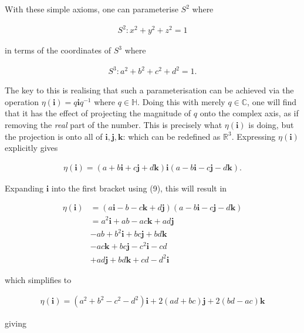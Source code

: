 \documentclass[fleqn, twocolumn, 10pt]{article}
\begin{document}
With these simple axioms, one can parameterise $S^2$ where

\begin{ceqn}
\begin{align*}
S^2 : x^2 + y^2 + z^2 = 1
\end{align*}
\end{ceqn}
in terms of the coordinates of $S^3$ where


\begin{ceqn}
\begin{align}\tag{10}
S^3 : a^2 + b^2 + c^2 + d^2 = 1.
\end{align}
\end{ceqn}
The key to this is realising that such a parameterisation can be achieved via the operation $\eta(\mathbf{i}) = q\mathbf{i}q^{-1}$ where $q \in \mathbb{H}$. Doing this with merely $q \in \mathbb{C}$, one will find that it has the effect of projecting the magnitude of $q$ onto the complex axis, as if removing the \textit{real} part of the number. This is precisely what $\eta(\mathbf{i})$ is doing, but the projection is onto all of $\mathbf{i}, \mathbf{j}, \mathbf{k}$: which can be redefined as $\mathbb{R}^3$. Expressing $\eta(\mathbf{i})$ explicitly gives

\begin{ceqn}
\begin{align*}
\eta(\mathbf{i}) = (a + b\mathbf{i} + c\mathbf{j} + d\mathbf{k})\mathbf{i}(a - b\mathbf{i} - c\mathbf{j} - d\mathbf{k}).
\end{align*}
\end{ceqn}
Expanding $\mathbf{i}$ into the first bracket using (9), this will result in

\begin{ceqn}
\begin{align*}
\eta(\mathbf{i}) &= (a\mathbf{i} - b - c\mathbf{k} + d\mathbf{j})(a - b\mathbf{i} - c\mathbf{j} - d\mathbf{k})\\ 
&= a^2\mathbf{i} + ab - ac\mathbf{k} + ad\mathbf{j}\\
&- ab + b^2\mathbf{i} + bc\mathbf{j} + bd\mathbf{k}\\
&-ac\mathbf{k} + bc\mathbf{j} - c^2\mathbf{i} - cd\\
&+ ad\mathbf{j} + bd\mathbf{k} + cd - d^2\mathbf{i}
\end{align*}
\end{ceqn}
which simplifies to

\begin{ceqn}
\begin{align*}
\eta(\mathbf{i}) = (a^2 + b^2 - c^2 - d^2)\mathbf{i} + 2(ad + bc)\mathbf{j} + 2(bd-ac)\mathbf{k}
\end{align*}
\end{ceqn}
giving
\end{document}
